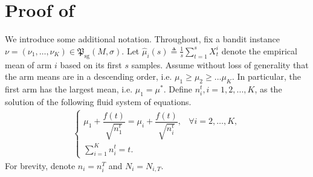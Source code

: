 \documentclass[nonblindrev]{informs3_noinforms}
\begin{document}
\section{Proof of }\label{sec: proof-ucb-f}
{
We introduce some additional notation. Throughout, fix a bandit instance $\nu = (\nu_1, \dots, \nu_K) \in \mathfrak{P}_{\text{sg}}(M, \sigma)$. Let $\widehat\mu_i(s) \triangleq \frac{1}{s}\sum_{t = 1}^s X^i_t$ denote the empirical mean of arm $i$ based on its first $s$ samples. Assume without loss of generality that the arm means are in a descending order, i.e. $\mu_1 \ge \mu_2 \ge \dots \mu_K$. In particular, the first arm has the largest mean, i.e. $\mu_1 = \mu^*$. Define $n_i^t,  i=1,2,...,K$, as the solution of the following fluid system of equations.
\begin{align}\label{eq:fluid-balance}
\begin{cases}
    \mu_1+\dfrac{f(t)}{\sqrt{n_1^t}}=\mu_i+\dfrac{f(t)}{\sqrt{n_i^t}}, & \forall i=2,\dots,K,\\[2mm]
    \sum_{i=1}^K n_i^t = t.
\end{cases}
\end{align}
For brevity, denote $n_i = n_i^T$ and $N_i = N_{i, T}$.
}
\end{document}
